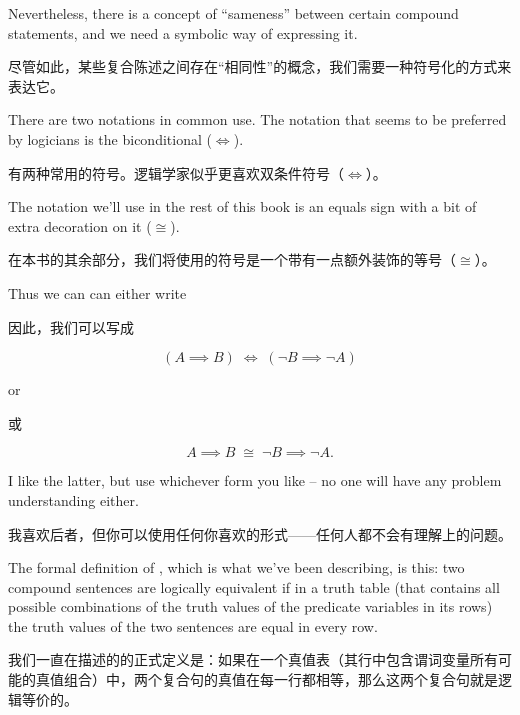 Nevertheless, there is a concept
of ``sameness'' between certain compound statements, and we need a 
symbolic way of expressing it.

尽管如此，某些复合陈述之间存在“相同性”的概念，我们需要一种符号化的方式来表达它。

There are two notations in common 
use.  The notation that seems to be preferred by logicians is the
biconditional ($\iff$).

有两种常用的符号。逻辑学家似乎更喜欢双条件符号（$\iff$）。

The notation we'll use
in the rest of this book is an equals sign with a bit of extra decoration
on it ($\cong$).

在本书的其余部分，我们将使用的符号是一个带有一点额外装饰的等号（$\cong$）。

Thus we can can either write 

因此，我们可以写成

\[ (A \implies B) \; \iff \; ({\lnot}B \implies {\lnot}A) \]

\noindent or 

\noindent 或

\[ A \implies B \; \cong \; {\lnot}B \implies {\lnot}A. \]

\noindent I like the latter, but use whichever form you like -- no one
will have any problem understanding either.

\noindent 我喜欢后者，但你可以使用任何你喜欢的形式——任何人都不会有理解上的问题。

The formal definition of , 
which is what we've
been describing, is this:  two compound sentences are logically equivalent
if in a truth table (that contains all possible combinations of the 
truth values of the predicate variables in its rows) the truth values
of the two sentences are equal in every row.

我们一直在描述的的正式定义是：如果在一个真值表（其行中包含谓词变量所有可能的真值组合）中，两个复合句的真值在每一行都相等，那么这两个复合句就是逻辑等价的。

